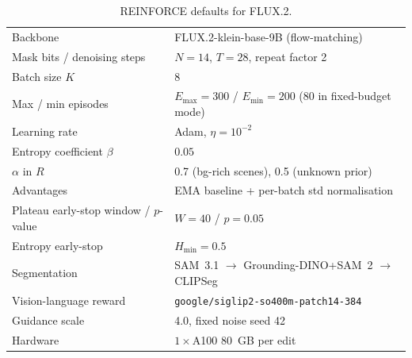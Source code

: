 \begin{table}[H]
    \centering
    \caption{REINFORCE defaults for FLUX.2.}
    \begin{tabular}{ll}
    \toprule
    Backbone & FLUX.2-klein-base-9B (flow-matching) \\
    Mask bits / denoising steps & $N=14$, $T=28$, repeat factor 2 \\
    Batch size $K$ & 8 \\
    Max / min episodes & $E_{\max}=300$ / $E_{\min}=200$ (80 in fixed-budget mode) \\
    Learning rate & Adam, $\eta=10^{-2}$ \\
    Entropy coefficient $\beta$ & $0.05$ \\
    $\alpha$ in $R$ & 0.7 (bg-rich scenes), 0.5 (unknown prior) \\
    Advantages & EMA baseline + per-batch std normalisation \\
    Plateau early-stop window / $p$-value & $W=40$ / $p=0.05$ \\
    Entropy early-stop & $H_{\min}=0.5$ \\
    Segmentation & SAM~3.1 $\to$ Grounding-DINO+SAM~2 $\to$ CLIPSeg \\
    Vision-language reward & \texttt{google/siglip2-so400m-patch14-384} \\
    Guidance scale & 4.0, fixed noise seed 42 \\
    Hardware & $1\times$A100 80~GB per edit \\
    \bottomrule
    \end{tabular}
    \label{tab::reinforce_hparams}
\end{table}
